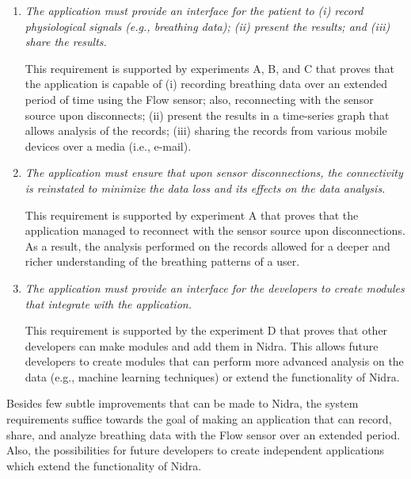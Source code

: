 \begin{enumerate}
    \item \textit{The application must provide an interface for the patient to (i) record physiological signals (e.g., breathing data); (ii) present the results; and (iii) share the results.}
    
    This requirement is supported by experiments A, B, and C that proves that the application is capable of (i) recording breathing data over an extended period of time using the Flow sensor; also, reconnecting with the sensor source upon disconnects; (ii) present the results in a time-series graph that allows analysis of the records; (iii) sharing the records from various mobile devices over a media (i.e., e-mail).

    \item \textit{The application must ensure that upon sensor disconnections, the connectivity is reinstated to minimize the data loss and its effects on the data analysis.}
    
    This requirement is supported by experiment A that proves that the application managed to reconnect with the sensor source upon disconnections. As a result, the analysis performed on the records allowed for a deeper and richer understanding of the breathing patterns of a user. 

    \item \textit{The application must provide an interface for the developers to create modules that integrate with the application.}
    
    This requirement is supported by the experiment D that proves that other developers can make modules and add them in Nidra. This allows future developers to create modules that can perform more advanced analysis on the data (e.g., machine learning techniques) or extend the functionality of Nidra.

\end{enumerate}

Besides few subtle improvements that can be made to Nidra, the system requirements suffice towards the goal of making an application that can record, share, and analyze breathing data with the Flow sensor over an extended period. Also, the possibilities for future developers to create independent applications which extend the functionality of Nidra.



